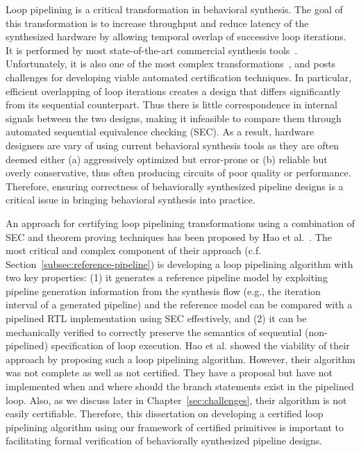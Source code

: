 Loop pipelining is a critical transformation in behavioral
synthesis. The goal of this transformation is to increase
throughput and reduce latency of the synthesized hardware by
allowing temporal overlap of successive loop iterations. It
is performed by most state-of-the-art commercial 
synthesis tools~\cite{forte,vivado,legup}.
Unfortunately, it is also one of the most complex transformations~\cite{tl:software-popl10},
and posts challenges for developing viable automated certification
techniques. In particular, efficient overlapping of loop
iterations creates a design that differs significantly from
its sequential counterpart. Thus there is little
correspondence in internal signals between the two designs,
making it infeasible to compare them through automated
sequential equivalence checking (SEC).
As a result, hardware designers are vary of using current behavioral synthesis tools as
they are often deemed either (a) aggressively optimized but error-prone or (b) reliable but overly conservative,
thus often producing circuits of poor quality
or performance. Therefore, ensuring
correctness of behaviorally synthesized pipeline designs
is a critical issue in bringing behavioral synthesis into practice.

An approach for certifying loop pipelining transformations
using a combination of SEC and theorem proving techniques
has been proposed by Hao et al.~\cite{hrx:dac-12}. The most critical and complex
component of their approach (c.f. Section~\ref{subsec:reference-pipeline}) is developing
a loop pipelining algorithm with two key properties: (1) it generates a reference pipeline model by exploiting
pipeline generation information from the synthesis flow (e.g., the iteration interval of a generated pipeline) 
and the reference model can be compared with a pipelined RTL implementation using SEC effectively, and (2) it
can be mechanically verified to correctly preserve the semantics of
sequential (non-pipelined) specification of loop execution.
Hao et al. showed the viability of their approach by proposing such a loop pipelining algorithm.
However, their algorithm was not complete as well as not certified. They have a proposal but have not implemented when and where should the branch statements exist in the pipelined loop. Also, as we discuss later in Chapter~\ref{sec:challenges}, their algorithm is not easily certifiable. Therefore, this dissertation on developing a certified loop pipelining algorithm using our framework of certified primitives is important to facilitating formal verification of behaviorally synthesized pipeline designs.


